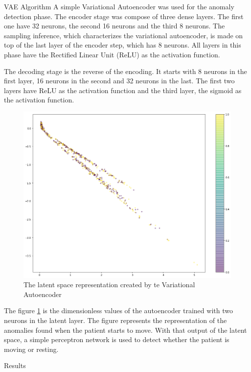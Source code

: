 \documentclass[a4paper, 12pt]{ppgeb}
\makeatletter
\renewcommand{\section}{\@startsection
{section}
{1}
{0mm}
{-\baselineskip}
{0.5\baselineskip}
{\large\bfseries\scshape}}
\renewcommand{\subsection}{\@startsection
{subsection}
{2}
{0mm}
{-\baselineskip}
{0.5\baselineskip}
{\bf\sffamily}}
\makeatother
\begin{document}
\subsection{VAE Algorithm}
A simple Variational Autoencoder was used for the anomaly detection phase. The encoder stage was compose of three dense layers. The first one have 32 neurons, the second 16 neurons and the third 8 neurons. The sampling inference, which characterizes the variational autoencoder, is made on top of the last layer of the encoder step, which has 8 neurons. All layers in this phase have the Rectified Linear Unit (ReLU) as the activation function.

The decoding stage is the reverse of the encoding. It starts with 8 neurons in the first layer, 16 neurons in the second and 32 neurons in the last. The first two layers have ReLU as the activation function and the third layer, the sigmoid as the activation function.

\begin{figure}[h]
\centering
\includegraphics[width=.8\linewidth]{latent_space_vae.png}
\caption{The latent space representation created by te Variational Autoencoder} \label{fig_lat_space}
\end{figure}

The figure \ref{fig_lat_space} is the dimensionless values of the autoencoder trained with two neurons in the latent layer. The figure represents the representation of the anomalies found when the patient starts to move. With that output of the latent space, a simple perceptron network is used to detect whether the patient is moving or resting.

\section{Results}
\end{document}
